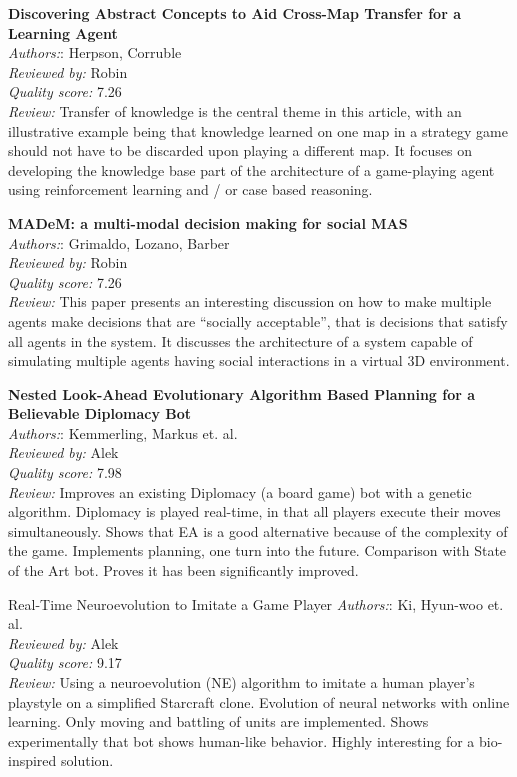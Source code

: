 \textbf{Discovering Abstract Concepts to Aid Cross-Map Transfer for a Learning Agent}\\
\textit{Authors:}: Herpson, Corruble\\
\textit{Reviewed by:} Robin\\
\textit{Quality score:} 7.26\\
\textit{Review:} Transfer of knowledge is the central theme in this article, with an illustrative example being that knowledge learned on one map in a strategy game should not have to be discarded upon playing a different map. It focuses on developing the knowledge base part of the architecture of a game-playing agent using reinforcement learning and / or case based reasoning.

\textbf{MADeM: a multi-modal decision making for social MAS}\\
\textit{Authors:}: Grimaldo, Lozano, Barber\\
\textit{Reviewed by:} Robin\\
\textit{Quality score:} 7.26\\
\textit{Review:} This paper presents an interesting discussion on how to make multiple agents make decisions that are ``socially acceptable'', that is decisions that satisfy all agents in the system. It discusses the architecture of a system capable of simulating multiple agents having social interactions in a virtual 3D environment. 

\textbf{Nested Look-Ahead Evolutionary Algorithm Based Planning for a Believable Diplomacy Bot}\\
\textit{Authors:}: Kemmerling, Markus et. al.\\
\textit{Reviewed by:} Alek	\\
\textit{Quality score:} 7.98\\
\textit{Review:} Improves an existing Diplomacy (a board game) bot with a genetic algorithm. Diplomacy is played real-time, in that all players execute their moves simultaneously. Shows that EA is a good alternative because of the complexity of the game. Implements planning, one turn into the future. Comparison with State of the Art bot. Proves it has been significantly improved.

Real-Time Neuroevolution to Imitate a Game Player
\textit{Authors:}: Ki, Hyun-woo et. al.\\
\textit{Reviewed by:} Alek\\
\textit{Quality score:} 9.17\\
\textit{Review:} Using a neuroevolution (NE) algorithm to imitate a human player's playstyle on a simplified Starcraft clone. Evolution of neural networks with online learning. Only moving and battling of units are implemented. Shows experimentally that bot shows human-like behavior. Highly interesting for a bio-inspired solution.

